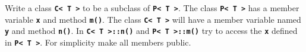 Write a class \texttt{\textbf{C< T >}} to be a subclass of \texttt{\textbf{P< T >}}. The class \texttt{\textbf{P< T >}} has a member variable \texttt{\textbf{x}} and method \texttt{\textbf{m()}}. The class \texttt{\textbf{C< T >}}\textbf{ }will have a member variable named \texttt{\textbf{y}} and method \texttt{\textbf{n()}}. In \texttt{\textbf{C< T >::n()}} and \texttt{\textbf{P< T >::m()}} try to access the \texttt{\textbf{x}} defined in \texttt{\textbf{P< T >}}. For simplicity make all members public.

